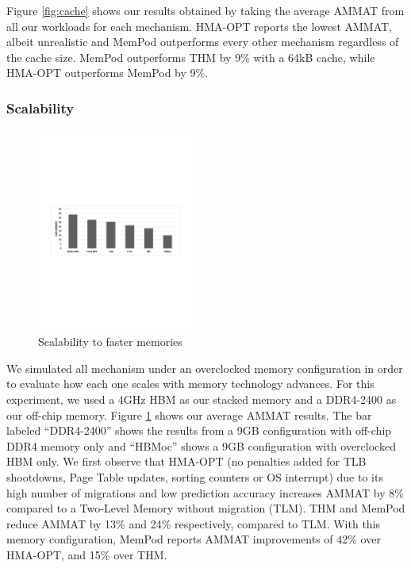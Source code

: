 Figure \ref{fig:cache} shows our results obtained by taking the average AMMAT from all our workloads for each mechanism. HMA-OPT reports the lowest AMMAT, albeit unrealistic and MemPod outperforms every other mechanism regardless of the cache size. MemPod outperforms THM by 9\% with a 64kB cache, while HMA-OPT outperforms MemPod by 9\%.

\subsubsection{Scalability}

\begin{figure}
  \includegraphics[width=0.46\textwidth]{figures/scalability.pdf}
  \caption{Scalability to faster memories}
  \label{fig:scalability}
\end{figure}

We simulated all mechanism under an overclocked memory configuration in order to evaluate how each one scales with memory technology advances. For this experiment, we used a 4GHz HBM as our stacked memory and a DDR4-2400 as our off-chip memory. Figure \ref{fig:scalability} shows our average AMMAT results. The bar labeled ``DDR4-2400'' shows the results from a 9GB configuration with off-chip DDR4 memory only and ``HBMoc'' shows a 9GB configuration with overclocked HBM only. We first observe that HMA-OPT (no penalties added for TLB shootdowns, Page Table updates, sorting counters or OS interrupt) due to its high number of migrations and low prediction accuracy increases AMMAT by 8\% compared to a Two-Level Memory without migration (TLM). THM and MemPod reduce AMMAT by 13\% and 24\% respectively, compared to TLM. With this memory configuration, MemPod reports AMMAT improvements of 42\% over HMA-OPT, and 15\% over THM. 

